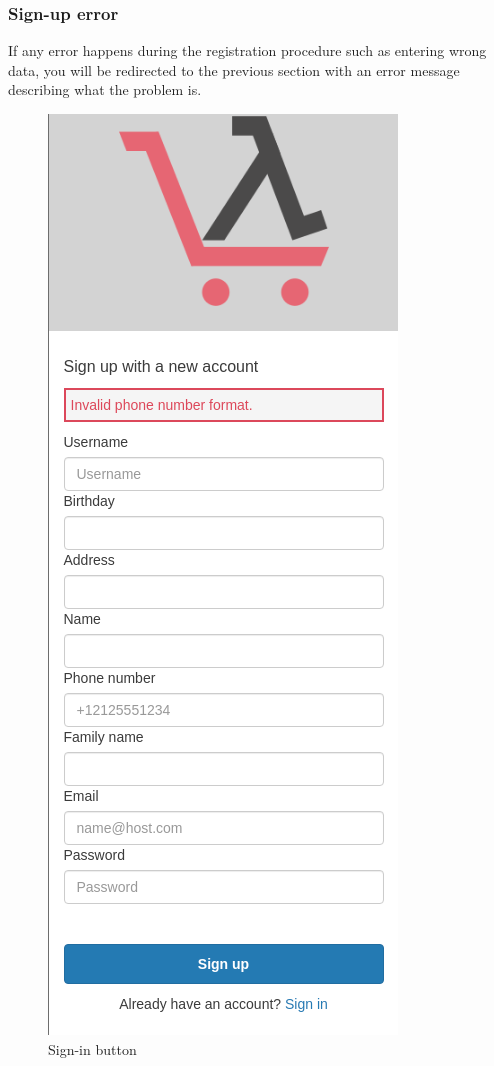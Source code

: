 \subsubsection{Sign-up error}
If any error happens during the registration procedure such as entering wrong data, you will be redirected to the previous section with an error message describing what the problem is.
\begin{figure}[!ht]
    \caption{Sign-in button}
    \vspace{10px}
    \includegraphics[scale=0.5]{../../../../Images/userManual/wrongData.png}
    \centering
\end{figure}
